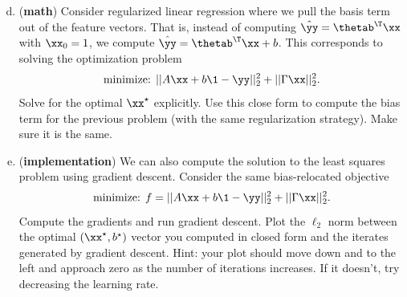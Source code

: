 \documentclass[12pt,letterpaper]{hmcpset}
\begin{document}
\begin{problem}[3 (continued)]
	\begin{enumerate}[(a)]
		\setcounter{enumi}{3}
		\item (\textbf{math}) Consider regularized linear regression where we pull the
		      basis term out of the feature vectors. That is, instead of computing $\hat\yy
			      = \thetab^\T\xx$ with $\xx_0 = 1$, we compute $\hat\yy = \thetab^\T\xx + b$.
		      This corresponds to solving the optimization problem
		      \[
			      \text{minimize: } ||A\xx + b\1 - \yy||_2^2 + ||\Gamma\xx||_2^2.
		      \]
		      Solve for the optimal $\xx^\star$ explicitly. Use this close form to compute the
		      bias term for the previous problem (with the same regularization strategy). Make
		      sure it is the same.
		      \newline
		\item (\textbf{implementation}) We can also compute the solution to the least squares
		      problem using gradient descent. Consider the same bias-relocated objective
		      \[
			      \text{minimize: } f = ||A\xx + b\1 - \yy||_2^2 + ||\Gamma\xx||_2^2.
		      \]
		      Compute the gradients and run gradient descent. Plot the $\ell_2$ norm
		      between the optimal $(\xx^\star, b^\star)$ vector you computed in closed form
		      and the iterates generated by gradient descent. Hint: your plot should move
		      down and to the left and approach zero as the number of iterations increases. If
		      it doesn't, try decreasing the learning rate.
	\end{enumerate}
\end{problem}
\begin{solution}
	\vfill
\end{solution}
\newpage
\end{document}
